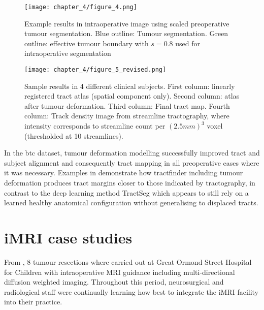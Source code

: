 \begin{figure*}[h!]
  \centering
  \texttt{[image: chapter\_4/figure\_4.png]}
  \caption{Example results in intraoperative image using scaled preoperative tumour segmentation. Blue outline: Tumour segmentation. Green outline: effective tumour boundary with $s=0.8$ used for intraoperative segmentation}
  \label{fig:shrink}
\end{figure*}

\begin{figure*}[h!]
  \centering
  \texttt{[image: chapter\_4/figure\_5\_revised.png]}
  \caption{Sample results in 4 different clinical subjects. First column: linearly registered tract atlas (spatial component only). Second column: atlas after tumour deformation. Third column: Final tract map. Fourth column: Track density image from streamline tractography, where intensity corresponds to streamline count per $(2.5mm)^3$ voxel (thresholded at 10 streamlines).}
  \label{fig:res}
\end{figure*}

In the \gls{btc} dataset, tumour deformation modelling successfully improved tract and subject alignment and consequently tract mapping in all preoperative cases where it was necessary.
Examples in  demonstrate how tractfinder including tumour deformation produces tract margins closer to those indicated by tractography, in contrast to the deep learning method TractSeg which appears to still rely on a learned healthy anatomical configuration without generalising to displaced tracts.

\section{iMRI case studies}

From , 8  tumour resections where carried out at Great Ormond Street Hospital for Children with intraoperative MRI guidance including multi-directional diffusion weighted imaging.
Throughout this period, neurosurgical and radiological staff were continually learning how best to integrate the iMRI facility into their practice.

